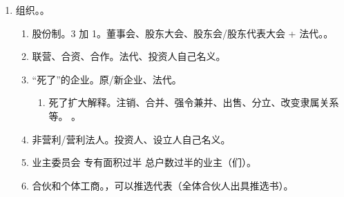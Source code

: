 \begin{enumerate}
\begin{enumerate}
          \item 合法 \yjt 反面，违法。。
          \item 其他组织 \yjt 不包括行政机关。。
                \begin{kk}{判断标准}
                  \begin{enumerate}
                    \item {}。必然有原告资格，必然有利害关系。
                    \item {}。仅限侵权/物权关系、公平竟争、亲属\cuo（死后继承有）、合同能民诉无行诉（）。
                          。
                    \item 不公平竟争。。
                  \end{enumerate}
                \end{kk}
          \item {}。
        \end{enumerate}
  \item 组织。。
        \begin{enumerate}
          \item 股份制。3 加 1。董事会、股东大会、股东会/股东代表大会 + 法代。。
          \item 联营、合资、合作。法代、投资人自己名义。
          \item “死了”的企业。原/新企业、法代。
                \begin{enumerate}
                  \item 死了扩大解释。注销、合并、强令兼并、出售、分立、改变隶属关系等。
                        。
                \end{enumerate}
          \item 非营利/营利法人。投资人、设立人自己名义。
          \item 业主委员会 \yjt 专有面积过半 \hz 总户数过半的业主（们）。
          \item 合伙和个体工商。，可以推选代表（全体合伙人出具推选书）。
        \end{enumerate}

\end{enumerate}
